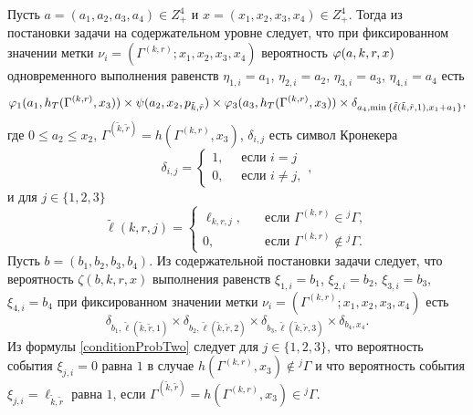 \documentclass[a4paper,12pt,russian]{extarticle}
\newcommand{\G}{\Gamma}
\newcommand{\ga}[1]{\Gamma^{\left( #1 \right)} }
\begin{document}
Пусть $a=(a_1, a_2, a_3, a_4) \in Z_+^4$ и $x=(x_1, x_2, x_3, x_4) \in Z_+^4$. Тогда из постановки задачи на содержательном уровне следует, что при фиксированном значении метки $\nu_i=(\ga{k,r}; x_1, x_2, x_3, x_4)$ вероятность $\varphi(a,k,r,x)$ одновременного выполнения равенств $\eta_{1,i}=a_1$, $\eta_{2,i}=a_2$, $\eta_{3,i}=a_3$, $\eta_{4,i}=a_4$ есть 
\begin{equation}
\vp_1(a_1,h_T(\ga{{k},{r}},x_3)) \times \psi(a_2,x_2, p_{\tilde{k},\tilde{r}}) \times \vp_3(a_3,h_T(\ga{{k},{r}},x_3))
\times \delta_{a_4,\min{\{\tilde{\ell}(\tilde{k},\tilde{r},1), x_1+a_1}\}},
\label{conditionProbOne}
\end{equation}
где $0\leqslant a_2\leqslant x_2$, $\ga{\tilde{k},\tilde{r}}=h(\ga{k,r},x_3)$,  $\delta_{i,j}$ есть символ Кронекера
\begin{equation*}
\delta_{i,j}=\begin{cases} 1, \quad \text{ если }i=j\\0, \quad \text{ если } i\neq j,
\end{cases},
\end{equation*}
и для $j\in \{1, 2, 3\}$
\begin{equation*}
\widetilde{\ell}(k,r,j)=\begin{cases}
\ell_{k,r,j},& \quad \text{если } \ga{k,r} \in {}^j\G,\\
0,& \quad \text{если } \ga{k,r} \notin {}^j\G. \end{cases}
\end{equation*}
Пусть $b=(b_1, b_2, b_3, b_4)$. Из содержательной постановки задачи следует, что вероятность $\zeta(b, k, r, x)$ выполнения равенств $\xi_{1,i}=b_1$, $\xi_{2,i}=b_2$, $\xi_{3,i}=b_3$, $\xi_{4,i}=b_4$ при фиксированном значении метки $\nu_i=(\ga{k,r}; x_1, x_2, x_3, x_4)$ есть
\begin{equation}
\delta_{b_1,\tilde{\ell}(\tilde{k},\tilde{r},1)} \times \delta_{b_2,\tilde{\ell}(\tilde{k},\tilde{r},2)} \times 
\delta_{b_3,\tilde{\ell}(\tilde{k},\tilde{r},3)} \times \delta_{b_4,x_4}.
\label{conditionProbTwo}
\end{equation}
Из формулы \eqref{conditionProbTwo} следует для $j\in \{1, 2, 3\}$, что вероятность события $\xi_{j,i}=0$ равна $1$ в случае $h(\ga{k,r},x_3)\notin {}^j\G$ и что вероятность события $\xi_{j,i}=\ell_{\tilde{k},\tilde{r}}$ равна $1$, если $\ga{\tilde{k},\tilde{r}}=h(\ga{k,r},x_3)\in {}^j\G$.
\end{document}
